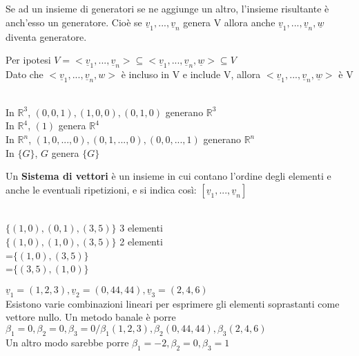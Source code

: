 \begin{nota}
	Se ad un insieme di generatori se ne aggiunge un altro, l'insieme risultante è anch'esso un generatore. Cioè se $\underline{v}_1,...,\underline{v}_n$ genera V allora anche $\underline{v}_1,...,\underline{v}_n,\underline{w}$ diventa generatore.
	\begin{dimostrazione}
		Per ipotesi $V=<\underline{v}_1,...,\underline{v}_n>\subseteq<\underline{v}_1,...,\underline{v}_n,\underline{w}>\subseteq V$\\
		Dato che $<\underline{v}_1,...,\underline{v}_n,w>$ è incluso in V e include V, allora $<\underline{v}_1,...,\underline{v}_n,\underline{w}>$ è V\\
		\begin{es}
			\phantom{}\\
			In $\mathbb{R}^3$, $(0,0,1),(1,0,0),(0,1,0)$ generano $\mathbb{R}^3$\\
			In $\mathbb{R}^4$, $(1)$ genera $\mathbb{R}^4$\\
			In $\mathbb{R}^n$, $(1,0,...,0),(0,1,...,0),(0,0,...,1)$ generano $\mathbb{R}^n$\\
			In $\{G\}$, $G$ genera $\{G\}$ 
		\end{es}
	\end{dimostrazione}
\end{nota}

Un \textbf{Sistema di vettori} è un insieme in cui contano l'ordine degli elementi e anche le eventuali ripetizioni, e si indica così: $[\underline{v}_1,...,\underline{v}_n]$
\begin{es}
	\phantom{}\\
	$\{(1,0),(0,1),(3,5)\}$ 3 elementi\\
	$\{(1,0),(1,0),(3,5)\}$ 2 elementi\\
	=$\{(1,0),(3,5)\}$\\
	=$\{(3,5),(1,0)\}$
\end{es}
\begin{nota}
$\underline{v}_1=(1,2,3),\underline{v}_2=(0,44,44),\underline{v}_3=(2,4,6)$\\
Esistono varie combinazioni lineari per esprimere gli elementi soprastanti come vettore nullo. Un metodo banale è porre $\beta_1=0,\beta_2=0,\beta_3=0/\beta_1(1,2,3),\beta_2(0,44,44),\beta_3(2,4,6)$\\
Un altro modo sarebbe porre $\beta_1=-2,\beta_2=0,\beta_3=1$
\end{nota}

